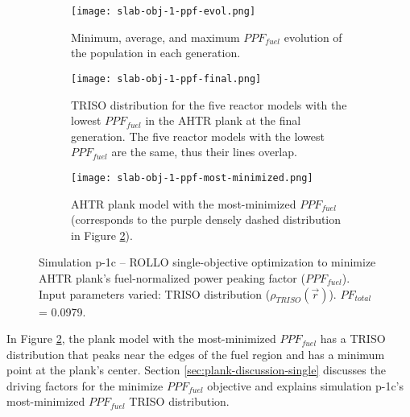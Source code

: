 \begin{figure}[htbp!]
    \centering
    \begin{subfigure}{0.9\textwidth}
        \texttt{[image: slab-obj-1-ppf-evol.png]}
        \caption{Minimum, average, and maximum $PPF_{fuel}$ evolution of the 
        population in each generation.}
        \label{fig:slab-obj-1-ppf-evol} 
    \end{subfigure}
    \begin{subfigure}{0.9\textwidth}
        \texttt{[image: slab-obj-1-ppf-final.png]}
        \caption{TRISO distribution for the five reactor models with the 
        lowest $PPF_{fuel}$ in the AHTR plank at the final generation.
        The five reactor models with the lowest $PPF_{fuel}$ are the same, thus 
        their lines overlap.}
        \label{fig:slab-obj-1-ppf-final} 
    \end{subfigure}
    \begin{subfigure}{0.9\textwidth}
        \texttt{[image: slab-obj-1-ppf-most-minimized.png]}
        \caption{\gls{AHTR} plank model with the most-minimized $PPF_{fuel}$
        (corresponds to the purple densely dashed distribution in Figure 
        \ref{fig:slab-obj-1-ppf-final}).}
        \label{fig:slab-obj-1-ppf-most-minimized} 
    \end{subfigure}
    \caption{Simulation p-1c -- ROLLO single-objective optimization to minimize 
    AHTR plank's fuel-normalized power peaking factor ($PPF_{fuel}$). 
    Input parameters varied: TRISO distribution ($\rho_{TRISO}(\vec{r})$).
    $PF_{total}$ = 0.0979.}
    \label{fig:slab-obj-1-ppf}
\end{figure}
In Figure \ref{fig:slab-obj-1-ppf-final}, the plank model with the most-minimized 
$PPF_{fuel}$ has a TRISO distribution that peaks near the edges of the fuel region and 
has a minimum point at the plank's center.
Section \ref{sec:plank-discussion-single} discusses the driving factors for the minimize 
$PPF_{fuel}$ objective and explains simulation p-1c's most-minimized $PPF_{fuel}$ 
TRISO distribution. 

